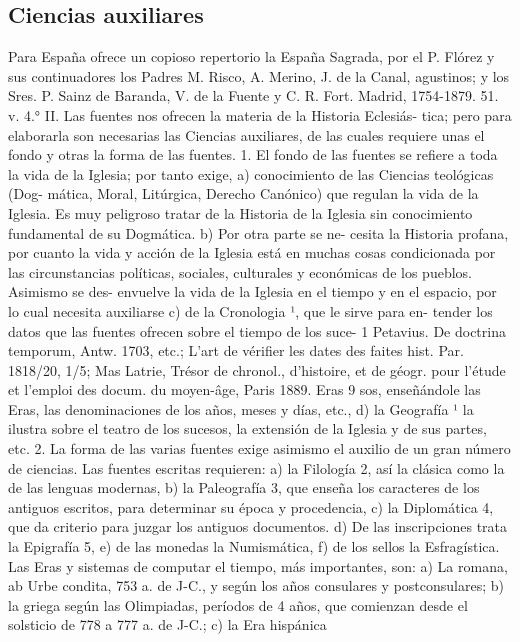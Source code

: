 \raggedbottom{} \documentclass[12pt, a4paper]{book}
\begin{document}
\subsection{Ciencias auxiliares} Para España ofrece un copioso repertorio la España Sagrada, por el
P. Flórez y sus continuadores los Padres M. Risco, A. Merino, J. de la
Canal, agustinos; y los Sres. P. Sainz de Baranda, V. de la Fuente y C. R.
Fort. Madrid, 1754-1879. 51. v. 4.°
II. Las fuentes nos ofrecen la materia de la Historia Eclesiás-
tica; pero para elaborarla son necesarias las Ciencias auxiliares, de
las cuales requiere unas el fondo y otras la forma de las fuentes.
1. El fondo de las fuentes se refiere a toda la vida de la Iglesia;
por tanto exige, a) conocimiento de las Ciencias teológicas (Dog-
mática, Moral, Litúrgica, Derecho Canónico) que regulan la vida de
la Iglesia. Es muy peligroso tratar de la Historia de la Iglesia sin
conocimiento fundamental de su Dogmática. b) Por otra parte se ne-
cesita la Historia profana, por cuanto la vida y acción de la Iglesia
está en muchas cosas condicionada por las circunstancias políticas,
sociales, culturales y económicas de los pueblos. Asimismo se des-
envuelve la vida de la Iglesia en el tiempo y en el espacio, por lo
cual necesita auxiliarse c) de la Cronologia ¹, que le sirve para en-
tender los datos que las fuentes ofrecen sobre el tiempo de los suce-
1 Petavius. De doctrina temporum, Antw. 1703, etc.; L'art de vérifier les dates des
faites hist. Par. 1818/20, 1/5; Mas Latrie, Trésor de chronol., d'histoire, et de géogr.
pour l'étude et l'emploi des docum. du moyen-âge, Paris 1889.
Eras
9
sos, enseñándole las Eras, las denominaciones de los años, meses y
días, etc., d) la Geografía ¹ la ilustra sobre el teatro de los sucesos,
la extensión de la Iglesia y de sus partes, etc.
2. La forma de las varias fuentes exige asimismo el auxilio de
un gran número de ciencias. Las fuentes escritas requieren: a) la
Filología 2, así la clásica como la de las lenguas modernas, b) la
Paleografía 3, que enseña los caracteres de los antiguos escritos,
para determinar su época y procedencia, c) la Diplomática 4, que da
criterio para juzgar los antiguos documentos. d) De las inscripciones
trata la Epigrafía 5, e) de las monedas la Numismática, f) de los
sellos la Esfragística.
Las Eras y sistemas de computar el tiempo, más importantes, son: a) La
romana, ab Urbe condita, 753 a. de J-C., y según los años consulares y
postconsulares; b) la griega según las Olimpiadas, períodos de 4 años, que
comienzan desde el solsticio de 778 a 777 a. de J-C.; c) la Era hispánica
\end{document}
